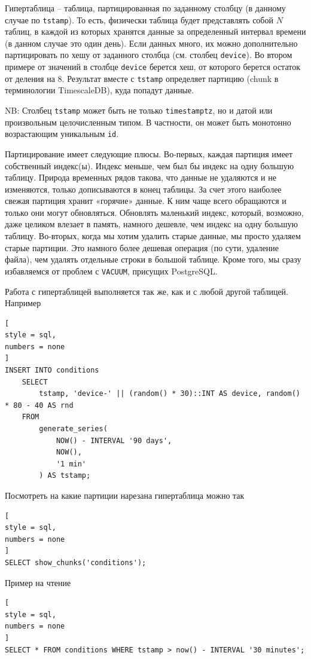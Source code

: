 \documentclass[%
	11pt,
	a4paper,
	utf8,
		]{article}
\begin{document}
Гипертаблица -- таблица, партицированная по заданному столбцу (в данному случае по \verb|tstamp|). То есть, физически таблица будет представлять собой $N$ таблиц, в каждой из которых хранятся данные за определенный интервал времени (в данном случае это один день). Если данных много, их можно дополнительно партицировать по хешу от заданного столбца (см. столбец \verb|device|). Во втором примере от значений в столбце \verb|device| берется хеш, от которого берется остаток от деления на 8. Результат вместе с \verb|tstamp| определяет партицию (chunk в терминологии TimescaleDB), куда попадут данные.

NB: Столбец \verb|tstamp| может быть не только \verb|timestamptz|, но и датой или произвольным целочисленным типом. В частности, он может быть монотонно возрастающим уникальным \verb|id|.

Партицирование имеет следующие плюсы. Во-первых, каждая партиция имеет собственный индекс(ы). Индекс меньше, чем был бы индекс на одну большую таблицу. Природа временных рядов такова, что данные не удаляются и не изменяются, только дописываются в конец таблицы. За счет этого наиболее свежая партиция хранит «горячие» данные. К ним чаще всего обращаются и только они могут обновляться. Обновлять маленький индекс, который, возможно, даже целиком влезает в память, намного дешевле, чем индекс на одну большую таблицу. Во-вторых, когда мы хотим удалить старые данные, мы просто удаляем старые партиции. Это намного более дешевая операция (по сути, удаление файла), чем удалять отдельные строки в большой таблице. Кроме того, мы сразу избавляемся от проблем с \verb|VACUUM|, присущих PostgreSQL.

Работа с гипертаблицей выполняется так же, как и с любой другой таблицей. Например
\begin{lstlisting}[
style = sql,
numbers = none
]
INSERT INTO conditions
	SELECT
		tstamp, 'device-' || (random() * 30)::INT AS device, random() * 80 - 40 AS rnd
	FROM
		generate_series(
			NOW() - INTERVAL '90 days',
			NOW(),
			'1 min'
		) AS tstamp;
\end{lstlisting}

Посмотреть на какие партиции нарезана гипертаблица можно так
\begin{lstlisting}[
style = sql,
numbers = none
]
SELECT show_chunks('conditions');
\end{lstlisting}

Пример на чтение
\begin{lstlisting}[
style = sql,
numbers = none
]
SELECT * FROM conditions WHERE tstamp > now() - INTERVAL '30 minutes';
\end{lstlisting}
\end{document}
